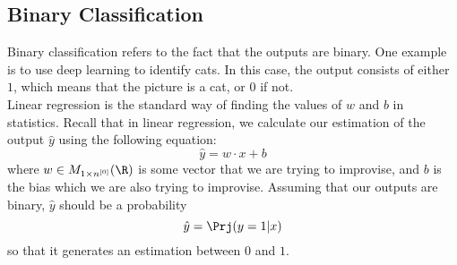 \documentclass[a4paper]{article}
\begin{document}
\subsection{Binary Classification}
Binary classification refers to the fact that the outputs are binary. One example is to use deep learning to identify cats. In this case, the output consists of either $1$, which means that the picture is a cat, or $0$ if not. \\

Linear regression is the standard way of finding the values of $w$ and $b$ in statistics. Recall that in linear regression, we calculate our estimation of the output $\hat{y}$ using the following equation: $$\hat{y}=w\cdot x+b$$ where $w\in M_{1\times n^{[0]}}(\R)$ is some vector that we are trying to improvise, and $b$ is the bias which we are also trying to improvise. Assuming that our outputs are binary, $\hat{y}$ should be a probability $$\hat{y}=\Prj(y=1|x)$$ so that it generates an estimation between $0$ and $1$.\\
\end{document}
